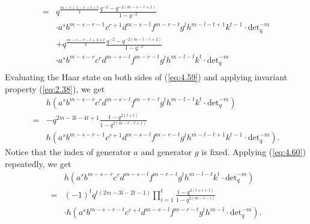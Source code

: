 \documentclass[table,a4paper,reqno]{amsart}
\numberwithin{equation}{section}
\theoremstyle{definition}
\begin{document}
\begin{equation}
\begin{split}
        =&q^{\frac{m-s+1-r+l+t}{2}}\frac{q^{-2}-q^{-2(m-s-r+1)}}{1-q^{-2}}\\
        &\cdot a^sb^{m-s-r-1}c^{r+1}d^{m-s-l}f^{m-r-t}g^lh^{m-l-t+1}k^{t-1}\cdot\text{det}_q^{-m}\\
        &+q^{\frac{m-s-r-l+3+t}{2}}\frac{q^{-2}-q^{-2(m-l-t+2)}}{1-q^{-2}}\\
        &\cdot a^sb^{m-s-r}c^rd^{m-s-l}f^{m-r-t}g^lh^{m-l-t}k^{t}\cdot\text{det}_q^{-m}\\
    \end{split}
\end{equation}
Evaluating the Haar state on both sides of (\ref{eq:4.59}) and applying invariant property (\ref{eq:2.38}), we get
\begin{equation}\label{eq:4.60}
    \begin{split}
        &h\left(a^sb^{m-s-r}c^rd^{m-s-l}f^{m-r-t}g^lh^{m-l-t}k^{t}\cdot\text{det}_q^{-m}\right)\\
        =&-q^{2m-3l-4t+1}\frac{1-q^{2(l+t)}}{1-q^{2(m-l-t+1)}}\\
        &h\left(a^sb^{m-s-r-1}c^{r+1}d^{m-s-l}f^{m-r-t}g^lh^{m-l-t+1}k^{t-1}\cdot\text{det}_q^{-m}\right).
    \end{split}
\end{equation}
Notice that the index of generator $a$ and generator $g$ is fixed. Applying (\ref{eq:4.60}) repeatedly, we get
\begin{equation}\label{eq:4.61}
    \begin{split}
        &h\left(a^sb^{m-s-r}c^rd^{m-s-l}f^{m-r-t}g^lh^{m-l-t}k^{t}\cdot\text{det}_q^{-m}\right)\\
        =&(-1)^tq^{t(2m-3l-2t-1)}\prod_{i=1}^t\frac{1-q^{2(l+i+1)}}{1-q^{2(m-l-i)}}\\
        &\cdot h\left(a^sb^{m-s-r-t}c^{r+t}d^{m-s-l}f^{m-r-t}g^lh^{m-l}\cdot\text{det}_q^{-m}\right).
    \end{split}
\end{equation}
\end{document}
